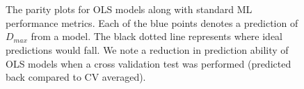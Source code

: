 \documentclass[11pt,a4paper]{article}                                %
\begin{document}
\begin{figure}[H]
\centering
{}
\\~\\
\caption{The parity plots for OLS models along with standard ML performance metrics. Each of the blue points denotes a prediction of $D_{max}$ from a model. The black dotted line represents where ideal predictions would fall. We note a reduction in prediction ability of OLS models when a cross validation test was performed (predicted back compared to CV averaged).}
\label{rc_lasso}
\end{figure}
\end{document}
